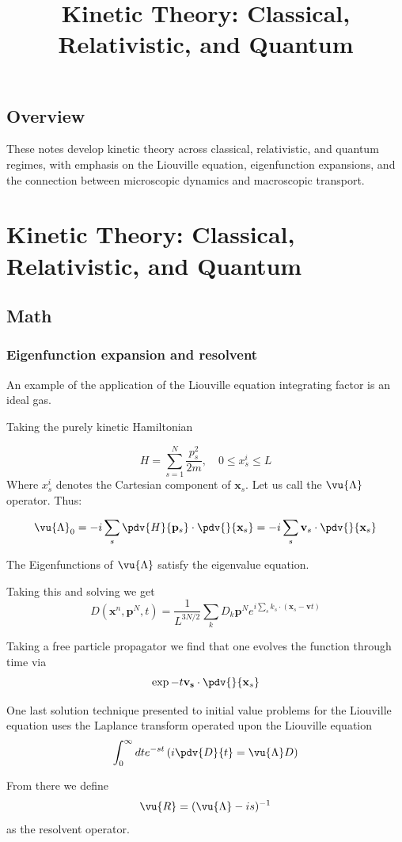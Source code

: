 \title{Kinetic Theory: Classical, Relativistic, and Quantum}

\section{Overview}
These notes develop kinetic theory across classical, relativistic, and quantum regimes, with emphasis on the Liouville equation, eigenfunction expansions, and the connection between microscopic dynamics and macroscopic transport.

\chapter{Kinetic Theory: Classical, Relativistic, and Quantum}
\section{Math}
\subsection{Eigenfunction expansion and resolvent}
An example of the application of the Liouville equation integrating factor is an ideal gas.

Taking the purely kinetic Hamiltonian

\[
H = \sum_{s=1}^N \frac{p^2_s}{2m}, \quad 0 \leq x^{i}_s \leq L
  \]
  Where $ x^{i}_s$ denotes the  Cartesian component of $\mathbf{x}_s$. Let us call the $\vu{\Lambda}$ operator. Thus:

\[
\vu{\Lambda}_0 = -i \sum_s \pdv{H}{\mathbf{p}_s} \cdot \pdv{}{\mathbf{x}_s} = -i \sum_s \mathbf{v}_s \cdot \pdv{}{\mathbf{x}_s}
  \]

  The Eigenfunctions of $\vu{\Lambda}$ satisfy the eigenvalue equation.

Taking this and solving we get
\[
D(\mathbf{x}^n, \mathbf{p}^N, t) = \frac{1}{L^{3N/2}}\sum_k D_k \mathbf{p}^Ne^{i \sum_s k_s \cdot (\mathbf{x}_s-\mathbf{v}t)}
  \]

  Taking a free particle propagator we find that one evolves the function through time via
\[
  \exp{-t \mathbf{v_s}} \cdot \pdv{}{\mathbf{x}_s} \]

One last solution technique presented to initial value problems for the Liouville equation uses the Laplance transform operated upon the Liouville equation
\[
\int_0^\infty dte^{-st}\left(i \pdv{D}{t} = \vu{\Lambda}D  \right)
  \]

  From there we define
\[
\vu{R} = (\vu{\Lambda} - is)^{-1}
  \]
  as the resolvent operator.

